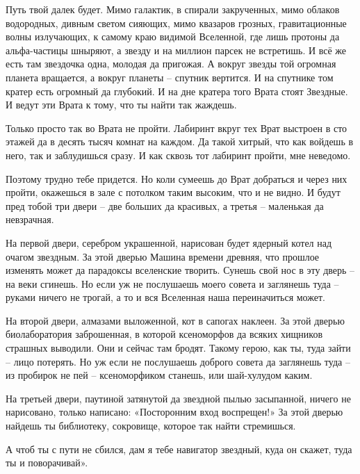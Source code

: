 \documentclass[ebook,oneside,final,openright]{memoir}
\begin{document}
\par
Путь твой далек будет. Мимо галактик, в спирали закрученных, мимо облаков водородных, дивным светом сияющих, мимо квазаров грозных, гравитационные волны излучающих, к самому краю видимой Вселенной, где лишь протоны да альфа-частицы шныряют, а звезду и на миллион парсек не встретишь. И всё же есть там звездочка одна, молодая да пригожая. А вокруг звезды той огромная планета вращается, а вокруг планеты – спутник вертится. И на спутнике том кратер есть огромный да глубокий. И на дне кратера того Врата стоят Звездные. И ведут эти Врата к тому, что ты найти так жаждешь.\par
\par
Только просто так во Врата не пройти. Лабиринт вкруг тех Врат выстроен в сто этажей да в десять тысяч комнат на каждом. Да такой хитрый, что как войдешь в него, так и заблудишься сразу. И как сквозь тот лабиринт пройти, мне неведомо.\par
\par
Поэтому трудно тебе придется. Но коли сумеешь до Врат добраться и через них пройти, окажешься в зале с потолком таким высоким, что и не видно. И будут пред тобой три двери – две больших да красивых, а третья – маленькая да невзрачная.\par
\par
На первой двери, серебром украшенной, нарисован будет ядерный котел над очагом звездным. За этой дверью Машина времени древняя, что прошлое изменять может да парадоксы вселенские творить. Сунешь свой нос в эту дверь – на веки сгинешь. Но если уж не послушаешь моего совета и заглянешь туда – руками ничего не трогай, а то и вся Вселенная наша переиначиться может.\par
\par
На второй двери, алмазами выложенной, кот в сапогах наклеен. За этой дверью биолаборатория заброшенная, в которой ксеноморфов да всяких хищников страшных выводили. Они и сейчас там бродят. Такому герою, как ты, туда зайти – лицо потерять. Но уж если не послушаешь доброго совета да заглянешь туда – из пробирок не пей – ксеноморфиком станешь, или шай-хулудом каким.\par
\par
На третьей двери, паутиной затянутой да звездной пылью засыпанной, ничего не нарисовано, только написано: «Посторонним вход воспрещен!» За этой дверью найдешь ты библиотеку, сокровище, которое так найти стремишься.\par
\par
А чтоб ты с пути не сбился, дам я тебе навигатор звездный, куда он скажет, туда ты и поворачивай».\par
\end{document}
